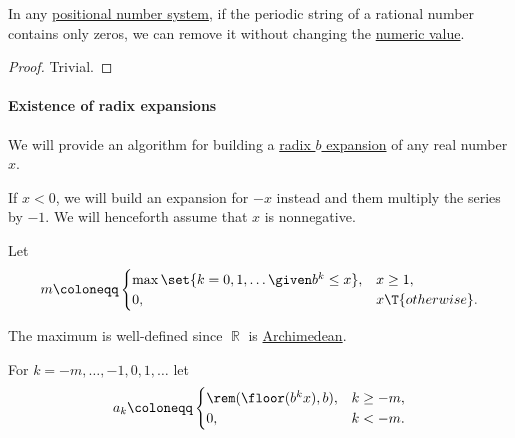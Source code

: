 \begin{proposition}\label{thm:removing_periodic_digit_string}
  In any \hyperref[def:positional_number_system]{positional number system}, if the periodic string of a rational number contains only zeros, we can remove it without changing the \hyperref[def:positional_notation_as_radix_expansion/rational_numbers]{numeric value}.
\end{proposition}
\begin{proof}
  Trivial.
\end{proof}

\paragraph{Existence of radix expansions}

\begin{algorithm}\label{alg:real_number_radix_expansion}
  We will provide an algorithm for building a \hyperref[def:real_number_radix_expansion]{radix \( b \) expansion} of any real number \( x \).

  \begin{thmenum}
     If \( x < 0 \), we will build an expansion for \( -x \) instead and them multiply the series by \( -1 \). We will henceforth assume that \( x \) is nonnegative.

     Let
    \begin{equation}\label{eq:alg:real_number_radix_expansion/m}
      m \coloneqq \begin{cases}
        \max\set{ k = 0, 1, \ldots \given b^k \leq x }, &x \geq 1, \\
        0,                                              &x \T{otherwise}.
      \end{cases}
    \end{equation}

    The maximum is well-defined since \( \BbbR \) is \hyperref[def:archimedean_semiring]{Archimedean}.

     For \( k = -m, \ldots, -1, 0, 1, \ldots \) let
    \begin{equation}\label{eq:alg:real_number_radix_expansion/direct}
      a_k \coloneqq \begin{cases}
        \rem(\floor(b^k x), b), &k \geq -m, \\
        0,                      &k < -m.
      \end{cases}
    \end{equation}


\end{thmenum}
\end{algorithm}
